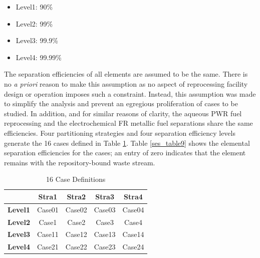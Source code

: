 \begin{itemize}
    \item Level1: 90\%
    \item Level2: 99\% 
    \item Level3: 99.9\%
    \item Level4: 99.99\%
\end{itemize}

The separation efficiencies of all elements are assumed to be the same.
There is no \emph{a priori} reason to make this assumption as no aspect of
reprocessing facility design or operation imposes such a constraint. 
Instead, this assumption was made to simplify the analysis and prevent
an egregious proliferation of cases to be studied.  In addition, and for
similar reasons of clarity, the aqueous PWR fuel reprocessing and the
electrochemical FR metallic fuel separations share the same
efficiencies. Four partitioning strategies and four separation
efficiency levels generate the 16 cases defined in Table \ref{ses_table8}.  
Table \ref{ses_table9} shows the elemental separation efficiencies for the cases; an entry of
zero indicates that the element remains with the repository-bound waste
stream.

\begin{table}[htbp]
\begin{center}
\caption{16 Case Definitions}
\label{ses_table8}
\begin{tabular}{|l|c|c|c|c|}
\hline
                & \textbf{Stra1} & \textbf{Stra2} & \textbf{Stra3} & \textbf{Stra4} \\
\hline
\textbf{Level1} & Case01         & Case02         & Case03         & Case04 \\
\textbf{Level2} & Case1          & Case2          & Case3          & Case4 \\
\textbf{Level3} & Case11         & Case12         & Case13         & Case14 \\
\textbf{Level4} & Case21         & Case22         & Case23         & Case24 \\
\hline
\end{tabular}
\end{center}
\end{table}


